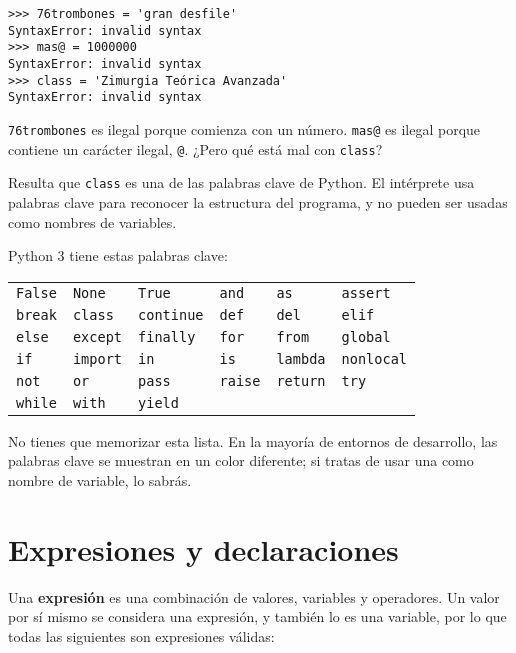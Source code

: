 \documentclass[12pt,letterpaper]{book}
\begin{document}
\begin{lstlisting}
>>> 76trombones = 'gran desfile'
SyntaxError: invalid syntax
>>> mas@ = 1000000
SyntaxError: invalid syntax
>>> class = 'Zimurgia Teórica Avanzada'
SyntaxError: invalid syntax
\end{lstlisting}

\texttt{76trombones} es ilegal porque comienza con un número. \texttt{mas@} es ilegal porque contiene un carácter ilegal, \texttt{@}. ¿Pero qué está mal con \texttt{class}?

Resulta que \texttt{class} es una de las palabras clave de Python. El intérprete usa palabras clave para reconocer la estructura del programa, y no pueden ser usadas como nombres de variables.

Python 3 tiene estas palabras clave:

\begin{center}
\begin{tabular}{llllll}
\texttt{False} & \texttt{None} & \texttt{True} & \texttt{and} & \texttt{as} & \texttt{assert} \\
\texttt{break} & \texttt{class} & \texttt{continue} & \texttt{def} & \texttt{del} & \texttt{elif} \\
\texttt{else} & \texttt{except} & \texttt{finally} & \texttt{for} & \texttt{from} & \texttt{global} \\
\texttt{if} & \texttt{import} & \texttt{in} & \texttt{is} & \texttt{lambda} & \texttt{nonlocal} \\
\texttt{not} & \texttt{or} & \texttt{pass} & \texttt{raise} & \texttt{return} & \texttt{try} \\
\texttt{while} & \texttt{with} & \texttt{yield} & & & \\
\end{tabular}
\end{center}

No tienes que memorizar esta lista. En la mayoría de entornos de desarrollo, las palabras clave se muestran en un color diferente; si tratas de usar una como nombre de variable, lo sabrás.

\section{Expresiones y declaraciones}

Una \textbf{expresión} es una combinación de valores, variables y operadores. Un valor por sí mismo se considera una expresión, y también lo es una variable, por lo que todas las siguientes son expresiones válidas:
\end{document}
